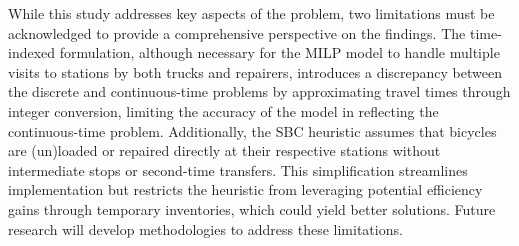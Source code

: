 While this study addresses key aspects of the problem, two limitations must be acknowledged to
provide a comprehensive perspective on the findings. The time-indexed formulation, although
necessary for the MILP model to handle multiple visits to stations by both trucks and repairers,
introduces a discrepancy between the discrete and continuous-time problems by approximating travel
times through integer conversion, limiting the accuracy of the model in reflecting the
continuous-time problem. Additionally, the SBC heuristic assumes that bicycles are (un)loaded or
repaired directly at their respective stations without intermediate stops or second-time transfers.
This simplification streamlines implementation but restricts the heuristic from leveraging potential
efficiency gains through temporary inventories, which could yield better solutions. Future research
will develop methodologies to address these limitations.
